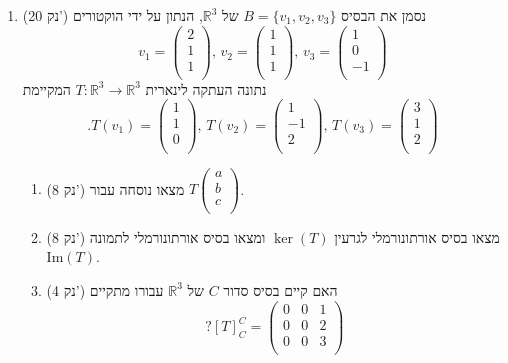 \documentclass[12pt, a4paper]{article}
\newcommand{\rr}{\mathbb{R}}
\newcommand{\im}{\mathrm{Im}}
\newcommand{\points}[1]{(#1 נק') }
\begin{document}
\begin{enumerate}
\newcommand{\secondQ}{
\item\points{20}
נסמן את הבסיס 
$B=\{v_1,v_2,v_3\}$
של
$\rr^3$,
הנתון על ידי הוקטורים
$$v_1=\begin{pmatrix}
2\\1\\1\\
\end{pmatrix},\,
v_2=\begin{pmatrix}
1\\1\\1\\
\end{pmatrix},\,
v_3=\begin{pmatrix}
1\\0\\-1\\
\end{pmatrix}$$
נתונה העתקה לינארית
$T:\rr^3\to\rr^3$
המקיימת
 $$
 .T(v_1)=
 \begin{pmatrix}
1\\1\\0\\
 \end{pmatrix},\,
 T(v_2)=
  \begin{pmatrix}
1\\-1\\2\\
 \end{pmatrix},
\,
  T(v_3)=
 \begin{pmatrix}
3\\1\\2\\
 \end{pmatrix}
$$
\begin{enumerate}
\item\points{8}
מצאו נוסחה עבור
$T\begin{pmatrix}
a\\b\\c\\
\end{pmatrix}$.
\item\points{8}
מצאו בסיס אורתונורמלי לגרעין 
$\ker(T)$
ומצאו בסיס אורתונורמלי לתמונה
$\im(T)$.
\item\points{4}
האם קיים בסיס
סדור
$C$
של
$\rr^3$
עבורו מתקיים
$$?[T]_C^C=
\begin{pmatrix}
0&0&1\\
0&0&2\\
0&0&3\\
\end{pmatrix}$$
\end{enumerate}
}
\secondQ


\end{enumerate}
\end{document}
